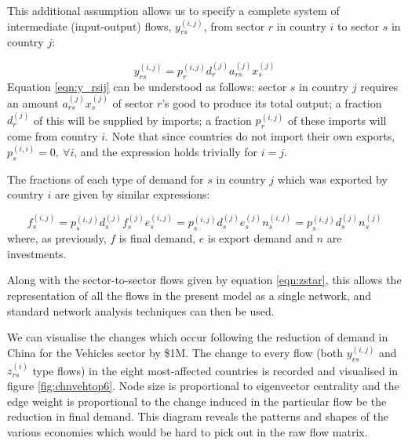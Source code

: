 \documentclass[a4paper]{article}
\begin{document}
This additional assumption allows us to specify a complete system of intermediate (input-output) flows, $y_{rs}^{(i,j)}$, from sector $r$ in country $i$ to sector $s$ in country $j$:

\begin{equation}\label{eqn:y_rsij}
y_{rs}^{(i,j)} = p_{r}^{(i,j)} d_{r}^{(j)} a_{rs}^{(j)} x_{s}^{(j)}
\end{equation}
Equation \eqref{eqn:y_rsij} can be understood as follows:
sector $s$ in country $j$ requires an amount $a_{rs}^{(j)} x_{s}^{(j)}$ of sector $r$'s good to produce its total output;
a fraction $d_{r}^{(j)}$ of this will be supplied by imports;
a fraction $p_{r}^{(i,j)}$ of these imports will come from country $i$. Note that since countries do not import their own exports, $p_s^{(i,i)}=0,\ \forall i$, and the expression holds trivially for $i=j$.

The fractions of each type of demand for $s$ in country $j$ which was exported by country $i$ are given by similar expressions:

\begin{subequations}
\begin{equation}\label{eqn:y_rsij}
f_{s}^{(i,j)} = p_{s}^{(i,j)} d_{s}^{(j)} f_{s}^{(j)}
\end{equation}
\begin{equation}\label{eqn:y_rsij}
e_{s}^{(i,j)} = p_{s}^{(i,j)} d_{s}^{(j)} e_{s}^{(j)}
\end{equation}
\begin{equation}\label{eqn:y_rsij}
n_{s}^{(i,j)} = p_{s}^{(i,j)} d_{s}^{(j)} n_{s}^{(j)}
\end{equation}
\end{subequations}
where, as previously, $f$ is final demand, $e$ is export demand and $n$ are investments.

Along with the sector-to-sector flows given by equation \eqref{eqn:zstar}, this allows the representation of all the flows in the present model as a single network, and standard network analysis techniques can then be used.

We can visualise the changes which occur following the reduction of demand in China for the Vehicles sector by \$1M.
The change to every flow (both $y_{rs}^{(i,j)}$ and $z_{rs}^{(i)}$ type flows) in the eight most-affected countries is recorded and visualised in figure \ref{fig:chnvehtop6}.
Node size is proportional to eigenvector centrality and the edge weight is proportional to the change induced in the particular flow be the reduction in final demand.
This diagram reveals the patterns and shapes of the various economies which would be hard to pick out in the raw flow matrix.
\end{document}
